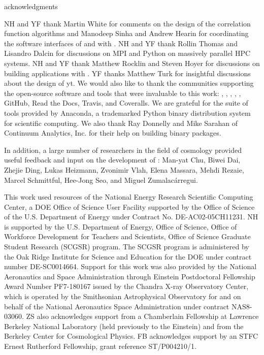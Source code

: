 acknowledgments

NH and YF thank Martin White for comments on the design of the
correlation function algorithms and Manodeep Sinha and
Andrew Hearin for coordinating the software interfaces of \Corrfunc{} and
\halotools{} with \nbkit{}. NH and YF thank Rollin Thomas and Lisandro
Dalcin for discussions on MPI and Python on massively parallel HPC systems.
NH and YF thank Matthew Rocklin and Steven Hoyer for discussions on
building applications with \dask{}.
YF thanks Matthew Turk for insightful discussions about the design of
\textsf{yt}. We would also like to thank the communities supporting
the open-source software and tools that were invaluable to this
work: \numpy{}, \scipy{}, \pandas{}, \ipython{}, \jupyter{},
GitHub, Read the Docs, Travis, and Coveralls.
We are grateful for the suite of tools provided by Anaconda, a
trademarked Python binary distribution system for
scientific computing. We also thank Ray Donnelly and Mike Sarahan of
Continuum Analytics, Inc. for their help on building \nbkit{} binary packages.

In addition, a large number of researchers in the field of cosmology
provided useful feedback and input on the development of \nbkit{}:
Man-yat Chu,
Biwei Dai,
Zhejie Ding,
Lukas Heizmann,
Zvonimir Vlah,
Elena Massara,
Mehdi Rezaie,
Marcel Schmittful,
Hee-Jong Seo, and
Miguel Zumalac\'{a}rregui.


This work used resources of the National Energy Research Scientific Computing
Center, a DOE Office of Science User Facility supported by the Office of
Science of the U.S. Department of Energy under Contract No. DE-AC02-05CH11231.
NH is supported by the U.S. Department of Energy, Office of Science, Office of
Workforce Development for Teachers and Scientists, Office of Science Graduate
Student Research (SCGSR) program. The SCGSR program is administered by the Oak
Ridge Institute for Science and Education for the DOE under contract number
DE-SC0014664. Support for this work was also provided by the National
Aeronautics and Space Administration through Einstein Postdoctoral Fellowship
Award Number PF7-180167 issued by the Chandra X-ray Observatory Center, which
is operated by the Smithsonian Astrophysical Observatory for and on behalf of
the National Aeronautics Space Administration under contract NAS8-03060.
ZS also acknowledges support from a Chamberlain Fellowship at Lawrence Berkeley
National Laboratory (held previously to the Einstein) and from the Berkeley
Center for Cosmological Physics.
FB acknowledges support by an STFC Ernest Rutherford Fellowship,
grant reference ST/P004210/1.


